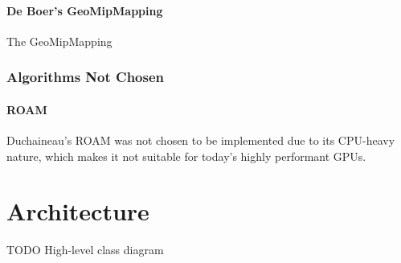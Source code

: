 \paragraph{De Boer's GeoMipMapping} The GeoMipMapping

\subsubsection{Algorithms Not Chosen}
\paragraph{ROAM} Duchaineau's ROAM was not chosen to be implemented due to its CPU-heavy nature, which makes it not suitable
for today's highly performant GPUs.

\section{Architecture}
TODO High-level class diagram
